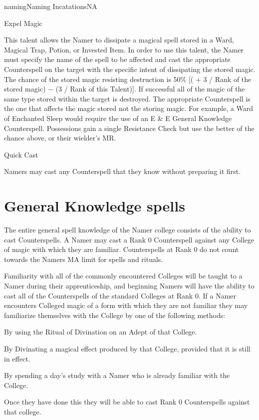 \begin{College}[2.0]{naming}{Naming Incatations}{NA}
\begin{talent}[T-2]{Expel Magic}
\begin{effects}
This talent allows the Namer to dissipate a magical spell stored in a
Ward, Magical Trap, Potion, or Invested Item. In order to use this
talent, the Namer must specify the name of the spell to be affected
and cast the appropriate Counterspell on the target with the specific
intent of dissipating the stored magic.  The chance of the stored
magic resisting destruction is 50\% [( + 3 / Rank of the stored magic)
  − (3 / Rank of this Talent)].  If successful all of the magic of the
same type stored within the target is destroyed.  The appropriate
Counterspell is the one that affects the magic stored not the storing
magic.  For example, a Ward of Enchanted Sleep would require the use
of an E \& E General Knowledge Counterspell. Possessions gain a single
Resistance Check but use the better of the chance above, or their
wielder’s MR.
\end{effects}
\end{talent}

\begin{talent}[T-3]{Quick Cast}

\begin{effects}
Namers may cast any Counterspell that they know without preparing it
first.
\end{effects}
\end{talent}

\section{General Knowledge spells}

The entire general spell knowledge of the Namer college consists of
the ability to cast Counterspells.  A Namer may cast a Rank 0
Counterspell against any College of magic with which they are
familiar.  Counterspells at Rank 0 do not count towards the Namers MA
limit for spells and rituals.

Familiarity with all of the commonly encountered Colleges will be
taught to a Namer during their apprenticeship, and beginning Namers
will have the ability to cast all of the Counterspells of the standard
Colleges at Rank 0. If a Namer encounters Colleged magic of a form
with which they are not familiar they may familiarize themselves with
the College by one of the following methods:
\begin{Itemize}
\item By using the Ritual of Divination on an Adept of that College.
\item By Divinating a magical effect produced by that College,
  provided that it is still in effect.
\item By spending a day’s study with a Namer who is already familiar
  with the College.
\end{Itemize}
Once they have done this they will be able to cast Rank 0
Counterspells against that college.


\end{College}
